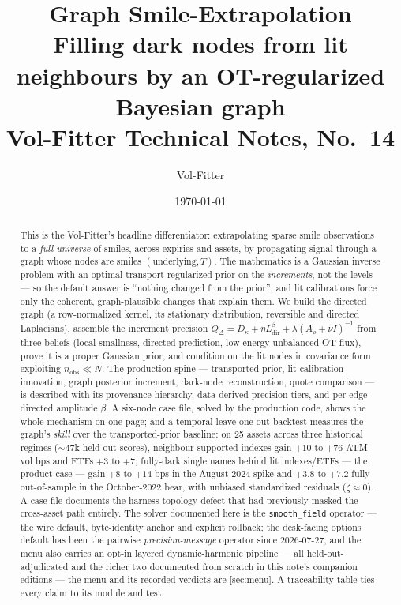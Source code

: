 \documentclass[11pt]{article}
\title{\textbf{Graph Smile-Extrapolation}\\[2pt]
\large Filling dark nodes from lit neighbours by an OT-regularized Bayesian graph\\[2pt]
\normalsize Vol-Fitter Technical Notes, No.~14}
\author{Vol-Fitter}
\date{\today}
\newcommand{\Ldir}{L_{\mathrm{dir}}}
\newcommand{\Qdel}{Q_{\Delta}}
\newcommand{\Arho}{A_{\rho}}
\begin{document}
\maketitle


\begin{abstract}
This is the Vol-Fitter's headline differentiator: extrapolating sparse smile
observations to a \emph{full universe} of smiles, across expiries and assets, by
propagating signal through a graph whose nodes are smiles $(\text{underlying},T)$.
The mathematics is a Gaussian inverse problem with an optimal-transport-regularized
prior on the \emph{increments}, not the levels --- so the default answer is
``nothing changed from the prior'', and lit calibrations force only the coherent,
graph-plausible changes that explain them. We build the directed graph (a
row-normalized kernel, its stationary distribution, reversible and directed
Laplacians), assemble the increment precision
$\Qdel=D_\kappa+\eta\Ldir^{\beta}+\lambda(\Arho+\nu I)^{-1}$ from three beliefs
(local smallness, directed prediction, low-energy unbalanced-OT flux), prove it is
a proper Gaussian prior, and condition on the lit nodes in covariance form
exploiting $n_{\text{obs}}\ll N$. The production spine --- transported prior,
lit-calibration innovation, graph posterior increment, dark-node reconstruction,
quote comparison --- is described with its provenance hierarchy, data-derived
precision tiers, and per-edge directed amplitude $\beta$. A six-node case file,
solved by the production code, shows the whole mechanism on one page; and a
temporal leave-one-out backtest measures the graph's \emph{skill} over the
transported-prior baseline: on 25 assets across three historical regimes
($\sim$47k held-out scores), neighbour-supported indexes gain $+10$ to $+76$
ATM vol bps and ETFs $+3$ to $+7$; fully-dark single names behind lit
indexes/ETFs --- the product case --- gain $+8$ to $+14$ bps in the
August-2024 spike and $+3.8$ to $+7.2$ fully out-of-sample in the October-2022
bear, with unbiased standardized residuals ($\bar\zeta\approx0$). A case file
documents the harness topology defect that had previously masked the
cross-asset path entirely. The solver documented here is the
\texttt{smooth\_field} operator --- the wire default, byte-identity anchor
and explicit rollback; the desk-facing options default has been the
pairwise \emph{precision-message} operator since 2026-07-27, and the menu
also carries an opt-in layered
dynamic-harmonic pipeline --- all held-out-adjudicated and the richer two
documented
from scratch in this note's companion editions --- the menu and its recorded
verdicts are \cref{sec:menu}. A traceability table ties every claim to its
module and test.
\end{abstract}
\end{document}
